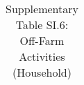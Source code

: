 \begin{longtable}{llcccccccccc}
\caption{Supplementary Table SI.6: Off-Farm Activities (Household)} \label{tab:pap__b8_hh} \\                                                                                                                                                                                                                                                                                                                                                                                                                                                                                                                                                                                                                                                                                                                                                                                             
\hline \hline                                                                                                                                                                                                                                                                                                                                                                                                                                                                                                                                                                                                                                                                                                                                                                                                                                                                             

\end{longtable}

